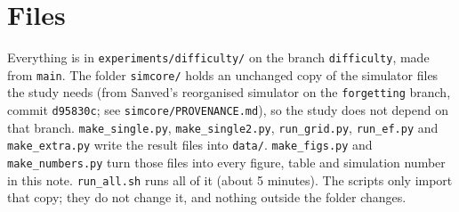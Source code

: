 \documentclass[11pt,a4paper]{article}
\begin{document}
\section{Files}
Everything is in \texttt{experiments/difficulty/} on the branch \texttt{difficulty}, made from \texttt{main}. The folder \texttt{simcore/} holds an unchanged copy of the simulator files the study needs (from Sanved's reorganised simulator on the \texttt{forgetting} branch, commit \texttt{d95830c}; see \texttt{simcore/PROVENANCE.md}), so the study does not depend on that branch. \texttt{make\_single.py}, \texttt{make\_single2.py}, \texttt{run\_grid.py}, \texttt{run\_ef.py} and \texttt{make\_extra.py} write the result files into \texttt{data/}. \texttt{make\_figs.py} and \texttt{make\_numbers.py} turn those files into every figure, table and simulation number in this note. \texttt{run\_all.sh} runs all of it (about 5 minutes). The scripts only import that copy; they do not change it, and nothing outside the folder changes.
\end{document}
